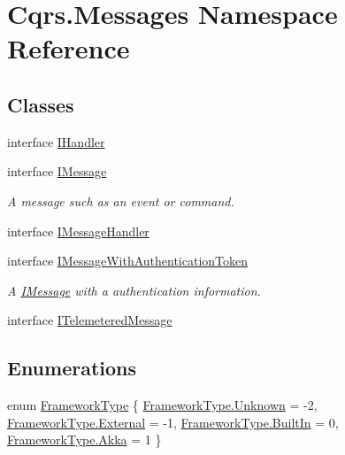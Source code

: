 \hypertarget{namespaceCqrs_1_1Messages}{}\section{Cqrs.\+Messages Namespace Reference}
\label{namespaceCqrs_1_1Messages}
\subsection*{Classes}
\begin{DoxyCompactItemize}
\item 
interface \hyperlink{interfaceCqrs_1_1Messages_1_1IHandler}{I\+Handler}
\item 
interface \hyperlink{interfaceCqrs_1_1Messages_1_1IMessage}{I\+Message}
\begin{DoxyCompactList}\small\item\em A message such as an event or command. \end{DoxyCompactList}\item 
interface \hyperlink{interfaceCqrs_1_1Messages_1_1IMessageHandler}{I\+Message\+Handler}
\item 
interface \hyperlink{interfaceCqrs_1_1Messages_1_1IMessageWithAuthenticationToken}{I\+Message\+With\+Authentication\+Token}
\begin{DoxyCompactList}\small\item\em A \hyperlink{interfaceCqrs_1_1Messages_1_1IMessage}{I\+Message} with a authentication information. \end{DoxyCompactList}\item 
interface \hyperlink{interfaceCqrs_1_1Messages_1_1ITelemeteredMessage}{I\+Telemetered\+Message}
\end{DoxyCompactItemize}
\subsection*{Enumerations}
\begin{DoxyCompactItemize}
\item 
enum \hyperlink{namespaceCqrs_1_1Messages_af06a7e6cd2609043d0f2f5f3419f81e3_af06a7e6cd2609043d0f2f5f3419f81e3}{Framework\+Type} \{ \hyperlink{namespaceCqrs_1_1Messages_af06a7e6cd2609043d0f2f5f3419f81e3_af06a7e6cd2609043d0f2f5f3419f81e3a88183b946cc5f0e8c96b2e66e1c74a7e}{Framework\+Type.\+Unknown} = -\/2, 
\hyperlink{namespaceCqrs_1_1Messages_af06a7e6cd2609043d0f2f5f3419f81e3_af06a7e6cd2609043d0f2f5f3419f81e3ab206a1b4ea1097761f78e8876f6da779}{Framework\+Type.\+External} = -\/1, 
\hyperlink{namespaceCqrs_1_1Messages_af06a7e6cd2609043d0f2f5f3419f81e3_af06a7e6cd2609043d0f2f5f3419f81e3aca8f2e8d70641ce17b9b304086c19657}{Framework\+Type.\+Built\+In} = 0, 
\hyperlink{namespaceCqrs_1_1Messages_af06a7e6cd2609043d0f2f5f3419f81e3_af06a7e6cd2609043d0f2f5f3419f81e3a1565c979ff6d5255fd3c81f57219fffc}{Framework\+Type.\+Akka} = 1
 \}
\end{DoxyCompactItemize}


